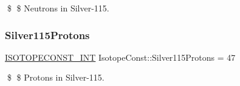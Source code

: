 \$ \$ Neutrons in Silver-\/115. \mbox{\label{group___isotope_const-_silver-_ag115_gac3d9bca2bc86ba6689abd8cbf2ce46ca}} 
\subsubsection{\texorpdfstring{Silver115\+Protons}{Silver115Protons}}
{\footnotesize\ttfamily \mbox{\hyperlink{group___isotope_const-_macros_ga5f18360b3e99483a35c32d789e62621c}{I\+S\+O\+T\+O\+P\+E\+C\+O\+N\+S\+T\+\_\+\+I\+NT}} Isotope\+Const\+::\+Silver115\+Protons = 47}

\$ \$ Protons in Silver-\/115. 